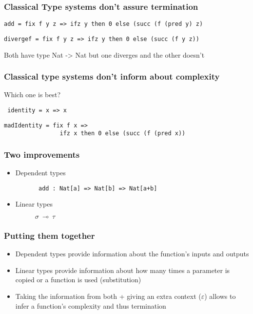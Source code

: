 \documentclass{beamer}
\begin{document}
\begin{frame}[fragile]
\frametitle{Classical Type systems don't assure termination}


\begin{verbatim}
add = fix f y z => ifz y then 0 else (succ (f (pred y) z)
\end{verbatim}

\begin{verbatim}
divergef = fix f y z => ifz y then 0 else (succ (f y z))
\end{verbatim}
Both have type Nat -> Nat but one diverges and the other doesn't
\end{frame}

\begin{frame}[fragile]
\frametitle{Classical type systems don't inform about complexity}
Which one is best? 
\begin{verbatim}
 identity = x => x 
\end{verbatim}
\begin{verbatim}
madIdentity = fix f x => 
                ifz x then 0 else (succ (f (pred x))
\end{verbatim}
\end{frame}

\begin{frame}[fragile]
\frametitle{Two improvements}
\begin{itemize}
\item Dependent types
\begin{figure}
\begin{verbatim}
 add : Nat[a] => Nat[b] => Nat[a+b]
\end{verbatim}
\end{figure}
\item Linear types \\
\begin{figure}
\begin{center}
$\sigma~\multimap~\tau$
\end{center}
\end{figure}
\end{itemize}
\end{frame}

\begin{frame}[fragile]
\frametitle{Putting them together}
\begin{itemize}
\item Dependent types provide information about the function's inputs and outputs

\item Linear types provide information about how many times a parameter is
  copied or a function is used (substitution)

\item Taking the information from both + giving an extra context
($\varepsilon$) allows to infer a function's complexity and thus termination
\end{itemize}
\end{frame}
\end{document}
